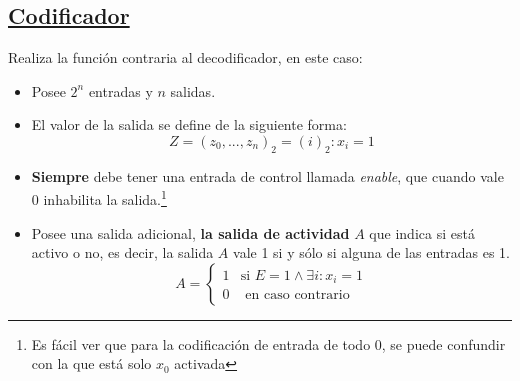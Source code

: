 \documentclass[a4paper,10pt]{book}
\begin{document}
\subsection*{\underline{Codificador}}
Realiza la función contraria al decodificador, en este caso:
\begin{itemize}
\item Posee $2^n$ entradas y $n$ salidas.
\item El valor de la salida se define de la siguiente forma:
$$Z=(z_0,...,z_n)_{2}=(i)_2: x_i=1$$
\item \textbf{Siempre} debe tener una entrada de control llamada \textit{enable}, que cuando vale 0 inhabilita la salida.\footnote{Es fácil ver que para la codificación de entrada de todo 0, se puede confundir con la que está solo $x_0$ activada}
\item Posee una salida adicional, \textbf{la salida de actividad} $A$ que indica si está activo o no, es decir, la salida $A$ vale 1 si  y sólo si alguna de las entradas es 1.
$$A=\begin{cases}1 & \mbox{si }E=1 \wedge \exists i: x_i=1\\
0 & \mbox{ en caso contrario}\end{cases}$$
\end{itemize}
\end{document}
